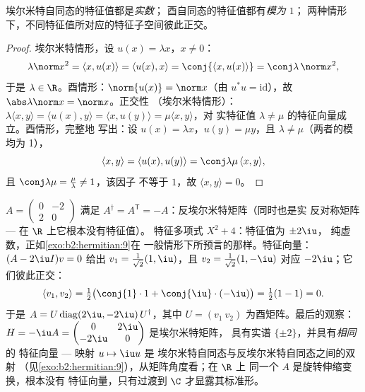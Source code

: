 \begin{proposition}\label{prop:b2:hermitian:eigenvalues}
埃尔米特自同态的特征值都是\emph{实数}；
酉自同态的特征值都有\emph{模为 $1$}；
两种情形下，不同特征值所对应的特征子空间彼此正交。
\end{proposition}

\begin{proof}
埃尔米特情形，设 $u(x) = \lambda x$，$x \neq 0$：
\[
\lambda \norm x^2 = \langle x, u(x)\rangle = \langle u(x), x\rangle
= \conj{\langle x, u(x)\rangle} = \conj\lambda\,\norm x^2 ,
\]
于是 $\lambda \in \R$。酉情形：$\norm{u(x)} = \norm x$（由 $u^*u =
\mathrm{id}$），故 $\abs\lambda\norm x = \norm x$。正交性
（埃尔米特情形）：$\lambda\langle x, y\rangle = \langle u(x),
y\rangle = \langle x, u(y)\rangle = \mu\langle x, y\rangle$，对
实特征值 $\lambda \neq \mu$ 的特征向量成立。酉情形，完整地
写出：设 $u(x) = \lambda x$，$u(y) = \mu y$，且 $\lambda \neq
\mu$（两者的模均为 1），
\[
\langle x, y\rangle = \langle u(x), u(y)\rangle
= \conj\lambda\mu\,\langle x, y\rangle ,
\]
且 $\conj\lambda\mu = \frac{\mu}{\lambda} \neq 1$，该因子
不等于 $1$，故 $\langle x, y\rangle = 0$。
\end{proof}

\begin{example}[反埃尔米特矩阵的对角化]\label{ex:b2:hermitian:skewexample}
$A = \begin{pmatrix} 0 & -2\\ 2 & 0\end{pmatrix}$ 满足
$A^\dagger = A^{\mathsf T} = -A$：反埃尔米特矩阵（同时也是实
反对称矩阵 --- 在 $\R$ 上它根本没有特征值）。
特征多项式 $X^2 + 4$：特征值为 $\pm2\iu$，
纯虚数，正如\cref{exo:b2:hermitian:9}在
一般情形下所预言的那样。特征向量：$(A - 2\iu I)v = 0$ 给出 $v_1 =
\frac{1}{\sqrt2}(1, \iu)$，且 $v_2 = \frac{1}{\sqrt2}(1,
-\iu)$ 对应 $-2\iu$；它们彼此正交：
\[
\langle v_1, v_2\rangle
= \tfrac12\bigl(\conj{1}\cdot1 +
\conj{\iu}\cdot(-\iu)\bigr)
= \tfrac12(1 - 1) = 0 .
\]
于是 $A = U\operatorname{diag}(2\iu, -2\iu)\,U^\dagger$，其中 $U =
(v_1\ v_2)$ 为酉矩阵。最后的观察：$H = -\iu A =
\begin{pmatrix} 0 & 2\iu\\ -2\iu & 0\end{pmatrix}$ 是埃尔米特矩阵，
具有实谱 $\{\pm2\}$，并具有\emph{相同}的
特征向量 --- 映射 $u \mapsto \iu u$ 是
埃尔米特自同态与反埃尔米特自同态之间的双射
（见\cref{exo:b2:hermitian:9}），从矩阵角度看；在 $\R$ 上
同一个 $A$ 是旋转伸缩变换，根本没有
特征向量，只有过渡到 $\C$ 才显露其标准形。
\end{example}

